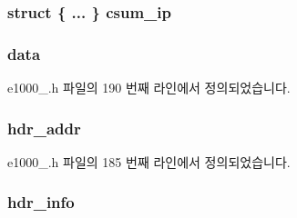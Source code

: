 \subsubsection[{\texorpdfstring{csum\+\_\+ip}{csum_ip}}]{\setlength{\rightskip}{0pt plus 5cm}struct \{ ... \}   csum\+\_\+ip}\hypertarget{unione1000__adv__rx__desc_a41b46582ef73aa8dc305e95234aa41b2}{}\label{unione1000__adv__rx__desc_a41b46582ef73aa8dc305e95234aa41b2}
\subsubsection[{\texorpdfstring{data}{data}}]{ data}\hypertarget{unione1000__adv__rx__desc_afc5d3d82c86bd8827a6251a93986acf8}{}\label{unione1000__adv__rx__desc_afc5d3d82c86bd8827a6251a93986acf8}


e1000\+\_.\+h 파일의 190 번째 라인에서 정의되었습니다.

\subsubsection[{\texorpdfstring{hdr\+\_\+addr}{hdr_addr}}]{ hdr\+\_\+addr}\hypertarget{unione1000__adv__rx__desc_a773bb72f266b15112bc68a5718a5957d}{}\label{unione1000__adv__rx__desc_a773bb72f266b15112bc68a5718a5957d}


e1000\+\_.\+h 파일의 185 번째 라인에서 정의되었습니다.

\subsubsection[{\texorpdfstring{hdr\+\_\+info}{hdr_info}}]{ hdr\+\_\+info}\hypertarget{unione1000__adv__rx__desc_a1b595e729e80904634882f6b1fc01e35}{}\label{unione1000__adv__rx__desc_a1b595e729e80904634882f6b1fc01e35}


